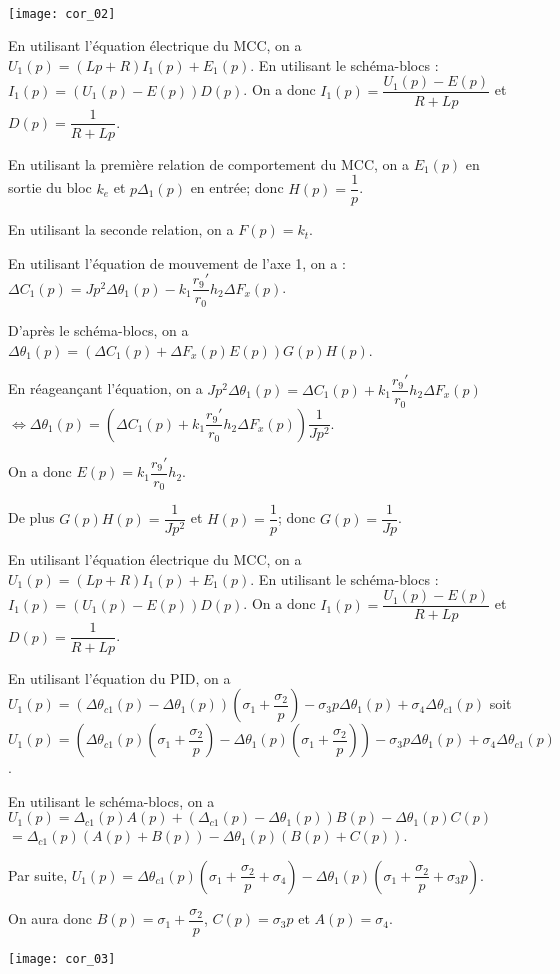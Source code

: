 \ifprof
\begin{corrige} ~\\

\begin{center}
\texttt{[image: cor\_02]}
\end{center}


En utilisant l'équation électrique du MCC, on a 
$U_1(p)=\left(L p   + R\right)I_1(p)+E_1(p)$. En utilisant le schéma-blocs :  $I_1(p)=\left(U_1(p) - E(p)\right) D(p)$. On a donc 
$I_1(p)=\dfrac{U_1(p) - E(p)}{R+Lp}$ et $D(p) = \dfrac{1}{R+Lp}$.

En utilisant la première relation de comportement du MCC, on a $E_1(p)$ en sortie du bloc $k_e$ et $p\Delta_1(p)$ en entrée; donc $H(p)=\dfrac{1}{p}$.

En utilisant la seconde relation, on a $F(p)=k_t$.

En utilisant l'équation de mouvement de l'axe 1, on a :
$\Delta C_1(p)=J p ^2  \Delta \theta_1(p) - k_1 \dfrac{r_9'}{r_0}h_2 \Delta F_x(p)$.

D'après le schéma-blocs, on a $\Delta \theta_1(p) = \left(\Delta C_1(p)+\Delta F_x(p) E(p)\right) G(p)H(p)$.

En réageançant l'équation, on a 
$J p ^2  \Delta \theta_1(p) = \Delta C_1(p) +  k_1 \dfrac{r_9'}{r_0}h_2 \Delta F_x(p) $
$ \Leftrightarrow   \Delta \theta_1(p) = \left(\Delta C_1(p) +  k_1 \dfrac{r_9'}{r_0}h_2 \Delta F_x(p)\right) \dfrac{1}{J p ^2} $.

On a donc $E(p)= k_1 \dfrac{r_9'}{r_0}h_2 $. 

De plus $G(p)H(p)=\dfrac{1}{Jp^2}$ et $H(p)=\dfrac{1}{p}$; donc $G(p)=\dfrac{1}{Jp}$.


En utilisant l'équation électrique du MCC, on a 
$U_1(p)=\left(L p   + R\right)I_1(p)+E_1(p)$. En utilisant le schéma-blocs :  $I_1(p)=\left(U_1(p) - E(p)\right) D(p)$. On a donc 
$I_1(p)=\dfrac{U_1(p) - E(p)}{R+Lp}$ et $D(p) = \dfrac{1}{R+Lp}$.


En utilisant l'équation du PID, on a 
$U_1(p)=\left( \Delta \theta_{c1}(p)-\Delta \theta_1(p)\right) \left(\sigma_1 + \dfrac{\sigma_2}{p}\right)- \sigma_3p \Delta \theta_1(p)+\sigma_4\Delta \theta_{c1}(p)$
soit $U_1(p)=\left( \Delta \theta_{c1}(p) \left(\sigma_1 + \dfrac{\sigma_2}{p}\right) -\Delta \theta_1(p) \left(\sigma_1 + \dfrac{\sigma_2}{p}\right)\right) - \sigma_3p \Delta \theta_1(p)+\sigma_4\Delta \theta_{c1}(p)$.

En utilisant le schéma-blocs, on a 
$U_1(p)=\Delta_{c1}(p) A(p) + \left(\Delta_{c1}(p) -\Delta\theta_{1}(p)\right) B(p) - \Delta\theta_{1}(p)C(p)$
$=\Delta_{c1}(p) \left( A(p) + B(p)\right) -\Delta\theta_{1}(p)  \left(B(p)+C(p)\right)$.

Par suite, 
$U_1(p)= \Delta \theta_{c1}(p) \left(\sigma_1 + \dfrac{\sigma_2}{p} +\sigma_4\right) -\Delta \theta_1(p) \left(\sigma_1 + \dfrac{\sigma_2}{p} + \sigma_3p\right)$.

On aura donc $B(p)=\sigma_1 + \dfrac{\sigma_2}{p}$, $C(p)=\sigma_3 p$ et  $A(p)=\sigma_4$.


\begin{center}
\texttt{[image: cor\_03]}
\end{center}
\end{corrige}
